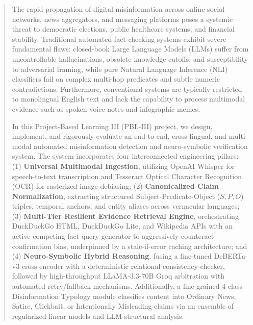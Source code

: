 \documentclass[12pt,a4paper]{report}
\begin{document}

\begin{abstract}
\noindent The rapid propagation of digital misinformation across online social networks, news aggregators, and messaging platforms poses a systemic threat to democratic elections, public healthcare systems, and financial stability. Traditional automated fact-checking systems exhibit severe fundamental flaws: closed-book Large Language Models (LLMs) suffer from uncontrollable hallucinations, obsolete knowledge cutoffs, and susceptibility to adversarial framing, while pure Natural Language Inference (NLI) classifiers fail on complex multi-hop predicates and subtle numeric contradictions. Furthermore, conventional systems are typically restricted to monolingual English text and lack the capability to process multimodal evidence such as spoken voice notes and infographic memes.

In this Project-Based Learning III (PBL-III) project, we design, implement, and rigorously evaluate an end-to-end, cross-lingual, and multi-modal automated misinformation detection and neuro-symbolic verification system. The system incorporates four interconnected engineering pillars: (1) \textbf{Universal Multimodal Ingestion}, utilizing OpenAI Whisper for speech-to-text transcription and Tesseract Optical Character Recognition (OCR) for rasterized image debiasing; (2) \textbf{Canonicalized Claim Normalization}, extracting structured Subject-Predicate-Object ($S, P, O$) triples, temporal anchors, and entity aliases across vernacular languages; (3) \textbf{Multi-Tier Resilient Evidence Retrieval Engine}, orchestrating DuckDuckGo HTML, DuckDuckGo Lite, and Wikipedia APIs with an active competing-fact query generator to aggressively counteract confirmation bias, underpinned by a stale-if-error caching architecture; and (4) \textbf{Neuro-Symbolic Hybrid Reasoning}, fusing a fine-tuned DeBERTa-v3 cross-encoder with a deterministic relational consistency checker, followed by high-throughput LLaMA-3.3-70B Groq arbitration with automated retry/fallback mechanisms. Additionally, a fine-grained 4-class Disinformation Typology module classifies content into Ordinary News, Satire, Clickbait, or Intentionally Misleading claims via an ensemble of regularized linear models and LLM structural analysis.


\end{abstract}
\end{document}
